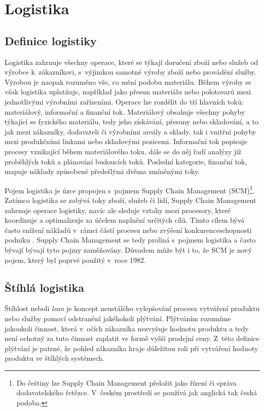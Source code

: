 \chapter{Logistika}

\section{Definice logistiky}

Logistika zahrnuje všechny operace, které se týkají doručení zboží nebo služeb od výrobce k~zákazníkovi, s~výjimkou samotné výroby zboží nebo provádění služby. Výrobou je naopak rozuměno vše, co mění podobu materiálu.
Během výroby se však logistika uplatňuje, například jako přesun materiálu nebo polotovarů mezi jednotlivými výrobními zařízeními. 
Operace lze rozdělit do tří hlavních toků: materiálový, informační a finanční tok. Materiálový obsahuje všechny pohyby týkající se fyzického materiálu, tedy jeho získávání, přesuny nebo skladování, a to jak mezi zákazníky, dodavateli či výrobními areály a sklady, tak i vnitřní pohyby mezi produkčními linkami nebo skladovými pozicemi. Informační tok popisuje procesy vznikající během materiálového toku, dále se do něj řadí analýzy již proběhlých toků a plánování budoucích toků. Poslední kategorie, finanční tok, mapuje náklady způsobené předešlými dvěma zmíněnými toky.\cite{bib:Baudin}

Pojem logistika je úzce propojen s~pojmem Supply Chain Management (SCM)\footnote{Do češtiny lze Supply Chain Management přeložit jako řízení či správa dodavatelského řetězce. V~českém prostředí se používá jak anglická tak česká podoba.}. Zatímco logistika se zabývá toky zboží, služeb či lidí, Supply Chain Management zahrnuje operace logistiky, navíc ale sleduje vztahy mezi procesory, které koordinuje a optimalizuje za účelem naplnění určitých cílů. Tímto cílem bývá často snížení nákladů v~rámci částí procesu nebo zvýšení konkurenceschopnosti podniku \cite{bib:IIMudaipur}. Supply Chain Management se tedy prolíná s~pojmem logistika a často bývají bývají tyto pojmy zaměňovány. Důvodem může být i to, že SCM je nový pojem, který byl poprvé použitý v~roce 1982.\cite{bib:Christopher} 

\section{Štíhlá logistika}

Štíhlost neboli \emph{lean} je koncept neustálého vylepšování procesu vytváření produktu nebo služby pomocí odstranění jakéhokoli plýtvání. Plýtváním rozumíme jakoukoli činnost, která v~očích zákazníka nezvyšuje hodnotu produktu a tedy není ochotný za tuto činnost zaplatit ve formě vyšší prodejní ceny. Z~této definice plýtvání je patrné, že pohled zákazníka hraje důležitou roli při vytváření hodnoty produktu ve štíhlých systémech.\cite{bib:LW1,bib:LW2}

